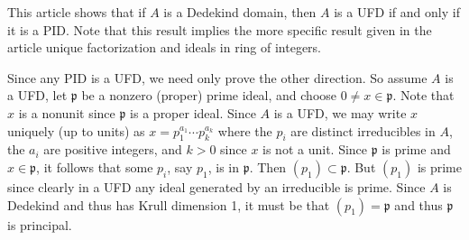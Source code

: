 \documentclass[12pt]{article}
\begin{document}
This article shows that if $A$ is a Dedekind domain, then $A$ is a UFD if and only if it is a PID. Note that this result implies the more specific result given in the article unique factorization and ideals in ring of integers.

Since any PID is a UFD, we need only prove the other direction. So assume $A$ is a UFD, let $\mathfrak{p}$ be a nonzero (proper) prime ideal, and choose $0\neq x\in\mathfrak{p}$. Note that $x$ is a nonunit since $\mathfrak{p}$ is a proper ideal. Since $A$ is a UFD, we may write $x$ uniquely (up to units) as $x=p_1^{a_1}\cdots p_k^{a_k}$ where the $p_i$ are distinct irreducibles in $A$, the $a_i$ are positive integers, and $k>0$ since $x$ is not a unit. Since $\mathfrak{p}$ is prime and $x\in\mathfrak{p}$, it follows that some $p_i$, say $p_1$, is in $\mathfrak{p}$. Then $(p_1)\subset\mathfrak{p}$. But $(p_1)$ is prime since clearly in a UFD any ideal generated by an irreducible is prime. Since $A$ is Dedekind and thus has Krull dimension 1, it must be that $(p_1)=\mathfrak{p}$ and thus $\mathfrak{p}$ is principal.

\end{document}
